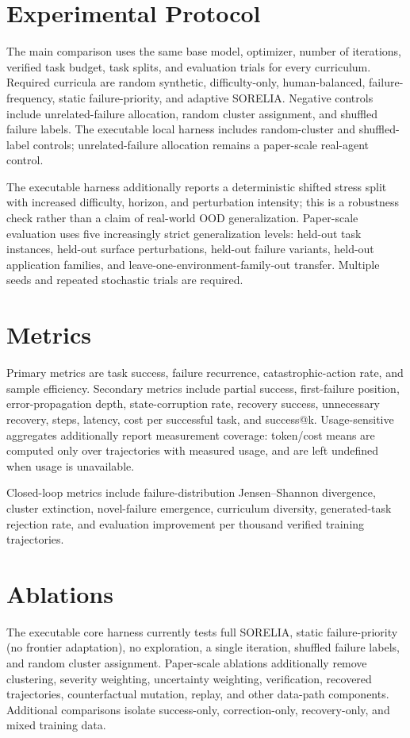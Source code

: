 \documentclass{article}
\begin{document}
\section{Experimental Protocol}
The main comparison uses the same base model, optimizer, number of iterations, verified task budget, task splits, and evaluation trials for every curriculum. Required curricula are random synthetic, difficulty-only, human-balanced, failure-frequency, static failure-priority, and adaptive SORELIA. Negative controls include unrelated-failure allocation, random cluster assignment, and shuffled failure labels. The executable local harness includes random-cluster and shuffled-label controls; unrelated-failure allocation remains a paper-scale real-agent control.

The executable harness additionally reports a deterministic shifted stress split with increased difficulty, horizon, and perturbation intensity; this is a robustness check rather than a claim of real-world OOD generalization. Paper-scale evaluation uses five increasingly strict generalization levels: held-out task instances, held-out surface perturbations, held-out failure variants, held-out application families, and leave-one-environment-family-out transfer. Multiple seeds and repeated stochastic trials are required.

\section{Metrics}
Primary metrics are task success, failure recurrence, catastrophic-action rate, and sample efficiency. Secondary metrics include partial success, first-failure position, error-propagation depth, state-corruption rate, recovery success, unnecessary recovery, steps, latency, cost per successful task, and success@k. Usage-sensitive aggregates additionally report measurement coverage: token/cost means are computed only over trajectories with measured usage, and are left undefined when usage is unavailable.

Closed-loop metrics include failure-distribution Jensen--Shannon divergence, cluster extinction, novel-failure emergence, curriculum diversity, generated-task rejection rate, and evaluation improvement per thousand verified training trajectories.

\section{Ablations}
The executable core harness currently tests full SORELIA, static failure-priority (no frontier adaptation), no exploration, a single iteration, shuffled failure labels, and random cluster assignment. Paper-scale ablations additionally remove clustering, severity weighting, uncertainty weighting, verification, recovered trajectories, counterfactual mutation, replay, and other data-path components. Additional comparisons isolate success-only, correction-only, recovery-only, and mixed training data.
\end{document}
